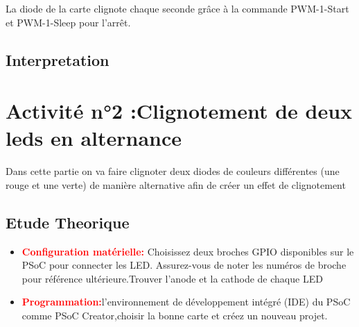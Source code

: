 La diode de la carte clignote chaque seconde grâce à la commande PWM-1-Start et  PWM-1-Sleep pour l’arrêt.
 
\subsection{Interpretation}
\label{sec:Interpretation}

\section{Activité n°2 :Clignotement de deux leds en alternance}
\label{chap:Activité n°2 :Clignotement de deux leds en alternance}
Dans cette partie on va faire clignoter deux diodes de couleurs différentes (une rouge et une verte) de manière alternative afin 
de créer un effet de clignotement 

\subsection{Etude Theorique}
\label{sec:Etude Theorique}
\begin{itemize}
    \item \textcolor{red}{\textbf{Configuration matérielle:}} Choisissez deux broches GPIO disponibles sur le PSoC pour connecter les LED.
     Assurez-vous de noter les numéros de broche pour référence ultérieure.Trouver l'anode et la cathode de chaque LED
    \item \textcolor{red}{\textbf{Programmation:}}l'environnement de développement intégré (IDE) du PSoC
     comme PSoC Creator,choisir la bonne carte et créez un nouveau projet.
\end{itemize}


